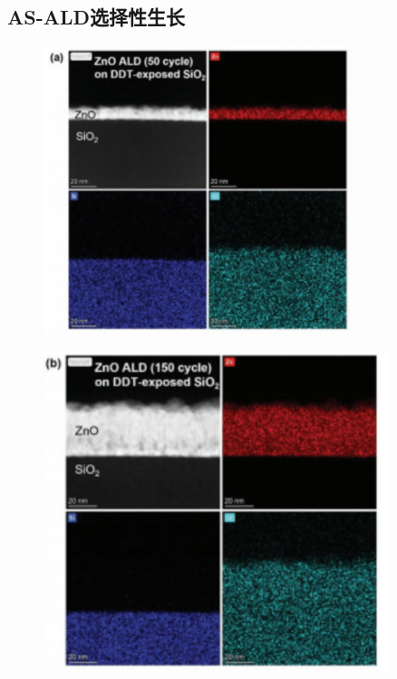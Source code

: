 \documentclass[UTF8,a4paper,12pt]{ctexart}%
\begin{document}
\subsection{AS-ALD选择性生长}


\begin{figure}[htb]
	\centering
	\begin{minipage}[t]{0.45\textwidth}
	\centering
	\includegraphics[width=0.8\textwidth]{15.jpg}
	\label{Fig:15}
	\end{minipage}
	\begin{minipage}[t]{0.45\textwidth}
	\centering
	\includegraphics[width=0.9\textwidth]{16.jpg}

\end{minipage}
\end{figure}
\end{document}
